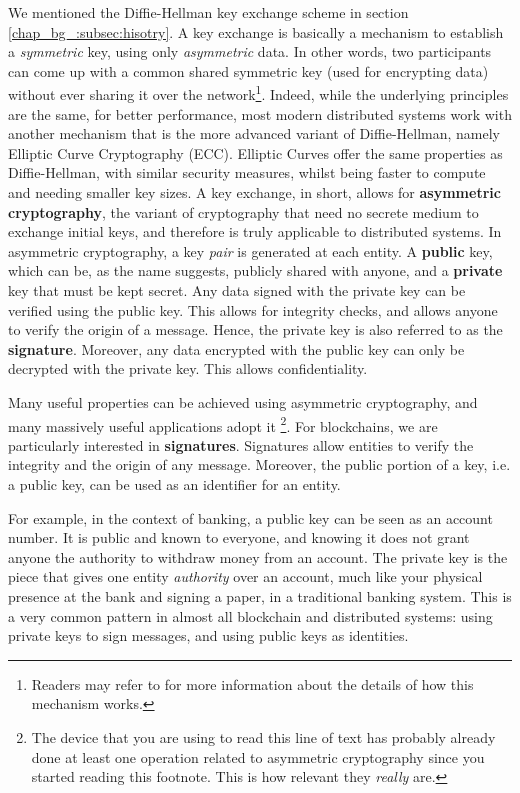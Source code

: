 We mentioned the Diffie-Hellman key exchange scheme in section \ref{chap_bg_:subsec:hisotry}. A key
exchange is basically a mechanism to establish a \textit{symmetric} key, using only
\textit{asymmetric} data. In other words, two participants can come up with a common shared
symmetric key (used for encrypting data) without ever sharing it over the network\footnote{Readers
may refer to \cite{diffieNewDirectionsCryptography1976} for more information about the details of
how this mechanism works.}. Indeed, while the underlying principles are the same, for better
performance, most modern distributed systems work with another mechanism that is the more advanced
variant of Diffie-Hellman, namely Elliptic Curve Cryptography (ECC). Elliptic Curves offer
the same properties as Diffie-Hellman, with similar security measures, whilst being faster to
compute and needing smaller key sizes. A key exchange, in short, allows for \textbf{asymmetric
cryptography}, the variant of cryptography that need no secrete medium to exchange initial
keys, and therefore is truly applicable to distributed systems. In asymmetric cryptography, a key
\textit{pair} is generated at each entity. A \textbf{public} key, which can be, as the name
suggests, publicly shared with anyone, and a \textbf{private} key that must be kept secret. Any data
signed with the private key can be verified using the public key. This allows for integrity checks,
and allows anyone to verify the origin of a message. Hence, the private key is also referred to as
the \textbf{signature}. Moreover, any data encrypted with the public key can only be decrypted with
the private key. This allows confidentiality.

Many useful properties can be achieved using asymmetric cryptography, and many massively useful
applications adopt it \footnote{The device that you are using to read this line of text has probably
already done at least one operation related to asymmetric cryptography since you started reading
this footnote. This is how relevant they \textit{really} are.}. For blockchains, we are particularly
interested in \textbf{signatures}. Signatures allow entities to verify the integrity and the origin
of any message. Moreover, the public portion of a key, i.e. a public key, can be used as an
identifier for an entity.

For example, in the context of banking, a public key can be seen as an account number. It is public
and known to everyone, and knowing it does not grant anyone the authority to withdraw money from an
account. The private key is the piece that gives one entity \textit{authority} over an account, much
like your physical presence at the bank and signing a paper, in a traditional banking system. This
is a very common pattern in almost all blockchain and distributed systems: using private keys to sign
messages, and using public keys as identities.

